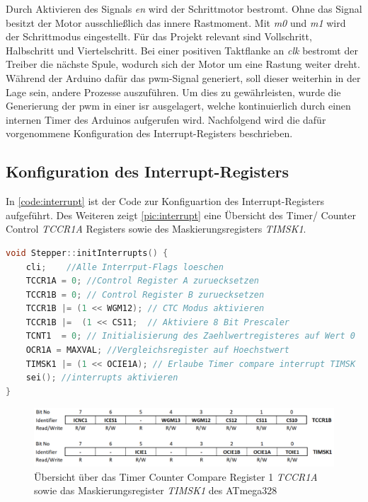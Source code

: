 Durch Aktivieren des Signals \textit{en} wird der Schrittmotor bestromt. Ohne das Signal besitzt der Motor ausschließlich das innere Rastmoment. Mit \textit{m0} und \textit{m1} wird der Schrittmodus eingestellt. Für das Projekt relevant sind Vollschritt, Halbschritt und Viertelschritt. Bei einer positiven Taktflanke an \textit{clk} bestromt der Treiber die nächste Spule, wodurch sich der Motor um eine Rastung weiter dreht. Während der Arduino dafür das  \acrshort{pwm}-Signal generiert, soll dieser weiterhin in der Lage sein, andere Prozesse auszuführen. Um dies zu gewährleisten, wurde die Generierung der  \acrshort{pwm} in einer \acrshort{isr} ausgelagert, welche kontinuierlich durch einen internen Timer des Arduinos aufgerufen wird. Nachfolgend wird die dafür vorgenommene Konfiguration des Interrupt-Registers beschrieben.\\

\subsection{Konfiguration des Interrupt-Registers}
\label{sec:interrupt}

In \autoref{code:interrupt} ist der Code zur Konfiguartion des Interrupt-Registers aufgeführt. Des Weiteren zeigt \autoref{pic:interrupt} eine Übersicht des Timer/ Counter Control \textit{TCCR1A} Registers sowie des Maskierungsregisters \textit{TIMSK1}.

\begin{lstlisting}[language=c, style=dhpaperdefault]
void Stepper::initInterrupts() {
	cli;	//Alle Interrput-Flags loeschen
	TCCR1A = 0;	//Control Register A zuruecksetzen
	TCCR1B = 0;	// Control Register B zuruecksetzen
	TCCR1B |= (1 << WGM12); // CTC Modus aktivieren
	TCCR1B |=  (1 << CS11;	// Aktiviere 8 Bit Prescaler
	TCNT1  = 0;	// Initialisierung des Zaehlwertregisteres auf Wert 0
	OCR1A = MAXVAL;	//Vergleichsregister auf Hoechstwert
	TIMSK1 |= (1 << OCIE1A); // Erlaube Timer compare interrupt TIMSK 
	sei(); //interrupts aktivieren 
}
\end{lstlisting}

\begin{figure}[h]
	\begin{center}
		\includegraphics[width=\textwidth]{interrupts.png}
		\caption{\label{pic:interrupt}Übersicht über das Timer Counter Compare Register 1 \textit{TCCR1A} sowie das Maskierungsregister \textit{TIMSK1} des ATmega328}
	\end{center}
\end{figure}

